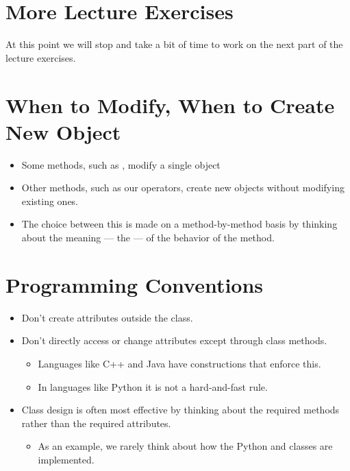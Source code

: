 \documentclass[letterpaper,10pt,english]{sphinxmanual}
\begin{document}
\section{More Lecture Exercises}
\label{\detokenize{lecture_notes/lec18_classes1:more-lecture-exercises}}
At this point we will stop and take a bit of time to work on the next
part of the lecture exercises.


\section{When to Modify, When to Create New Object}
\label{\detokenize{lecture_notes/lec18_classes1:when-to-modify-when-to-create-new-object}}\begin{itemize}
\item {} 
Some methods, such as , modify a single  object

\item {} 
Other methods, such as our operators, create new  objects
without modifying existing ones.

\item {} 
The choice between this is made on a method-by-method basis by
thinking about the meaning — the  — of the behavior of the
method.

\end{itemize}


\section{Programming Conventions}
\label{\detokenize{lecture_notes/lec18_classes1:programming-conventions}}\begin{itemize}
\item {} 
Don’t create attributes outside the class.

\item {} 
Don’t directly access or change attributes except through class
methods.
\begin{itemize}
\item {} 
Languages like C++ and Java have constructions that enforce this.

\item {} 
In languages like Python it is not a hard-and-fast rule.

\end{itemize}

\item {} 
Class design is often most effective by thinking about the required
methods rather than the required attributes.
\begin{itemize}
\item {} 
As an example, we rarely think about how the Python  and
 classes are implemented.

\end{itemize}

\end{itemize}
\end{document}
